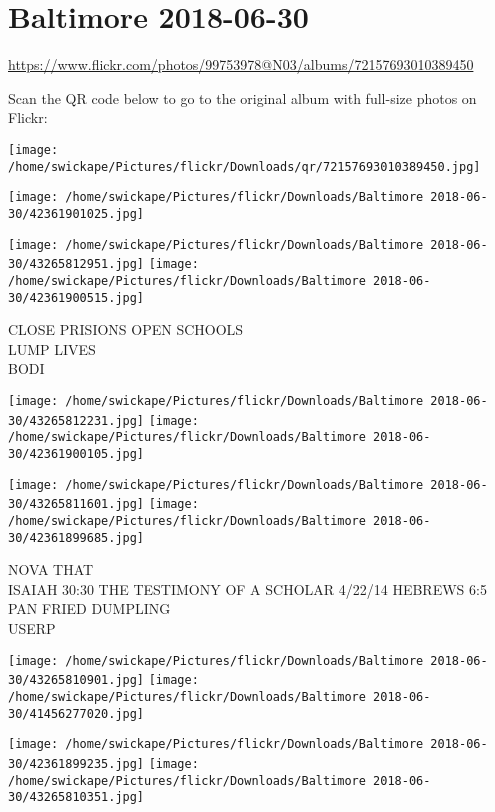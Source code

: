 \documentclass[10pt,letterpaper]{article}
\title{}
\author{}
\date{}
\begin{document}
\section*{Baltimore 2018-06-30}

\url{https://www.flickr.com/photos/99753978@N03/albums/72157693010389450}

Scan the QR code below to go to the original album with full-size photos on Flickr:

\texttt{[image: /home/swickape/Pictures/flickr/Downloads/qr/72157693010389450.jpg]}
\pagebreak

\texttt{[image: /home/swickape/Pictures/flickr/Downloads/Baltimore 2018-06-30/42361901025.jpg]}

\vspace{0.25in}
\texttt{[image: /home/swickape/Pictures/flickr/Downloads/Baltimore 2018-06-30/43265812951.jpg]}
\texttt{[image: /home/swickape/Pictures/flickr/Downloads/Baltimore 2018-06-30/42361900515.jpg]}

CLOSE PRISIONS OPEN SCHOOLS\\
LUMP LIVES\\
BODI
\pagebreak

\texttt{[image: /home/swickape/Pictures/flickr/Downloads/Baltimore 2018-06-30/43265812231.jpg]}
\texttt{[image: /home/swickape/Pictures/flickr/Downloads/Baltimore 2018-06-30/42361900105.jpg]}

\texttt{[image: /home/swickape/Pictures/flickr/Downloads/Baltimore 2018-06-30/43265811601.jpg]}
\texttt{[image: /home/swickape/Pictures/flickr/Downloads/Baltimore 2018-06-30/42361899685.jpg]}

NOVA THAT\\
ISAIAH 30:30 THE TESTIMONY OF A SCHOLAR 4/22/14 HEBREWS 6:5\\
PAN FRIED DUMPLING\\
USERP
\pagebreak

\texttt{[image: /home/swickape/Pictures/flickr/Downloads/Baltimore 2018-06-30/43265810901.jpg]}
\texttt{[image: /home/swickape/Pictures/flickr/Downloads/Baltimore 2018-06-30/41456277020.jpg]}

\texttt{[image: /home/swickape/Pictures/flickr/Downloads/Baltimore 2018-06-30/42361899235.jpg]}
\texttt{[image: /home/swickape/Pictures/flickr/Downloads/Baltimore 2018-06-30/43265810351.jpg]}
\end{document}

